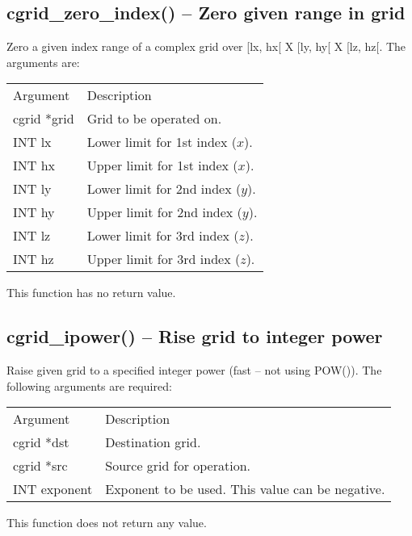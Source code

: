 \documentclass[12pt,letterpaper]{report}
\begin{document}
\subsection{cgrid\_zero\_index() -- Zero given range in grid}

Zero a given index range of a complex grid over [lx, hx[ X [ly, hy[ X [lz, hz[. The arguments are:
\begin{longtable}{p{} p{}}
Argument & Description\\
\cline{1-2}
cgrid *grid & Grid to be operated on.\\                                                                           
INT lx & Lower limit for 1st index ($x$).\\                                                                                     
INT hx & Upper limit for 1st index ($x$).\\                                                                                     
INT ly & Lower limit for 2nd index ($y$).\\                                                                                     
INT hy & Upper limit for 2nd index ($y$).\\                                                                                     
INT lz & Lower limit for 3rd index ($z$).\\                                                                                      INT hz & Upper limit for 3rd index ($z$).\\        
\end{longtable}
\noindent
This function has no return value.

\subsection{cgrid\_ipower() -- Rise grid to integer power}

Raise given grid to a specified integer power (fast -- not using POW()). The following arguments are required:
\begin{longtable}{p{} p{}}
Argument & Description\\
\cline{1-2}
cgrid *dst & Destination grid.\\
cgrid *src & Source grid for operation.\\
INT exponent & Exponent to be used. This value can be negative.\\
\end{longtable}
\noindent
This function does not return any value. 
\end{document}
